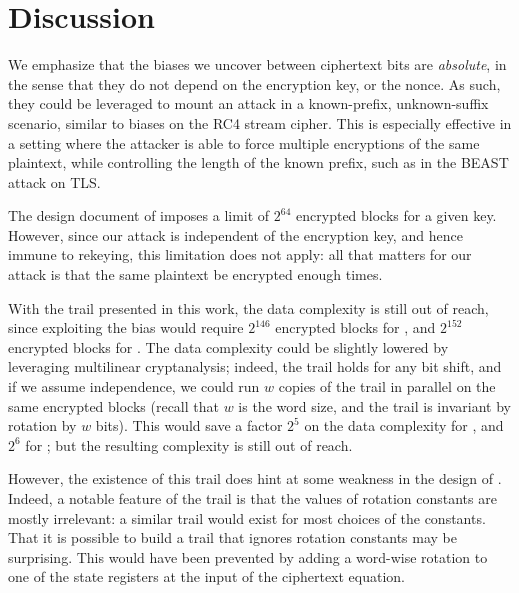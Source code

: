 \section{Discussion}
\label{sec/Discussion}


We emphasize that the biases we uncover between ciphertext bits are \emph{absolute}, in the sense that they do not depend on the encryption key, or the nonce. As such, they could be leveraged to mount an attack in a known-prefix, unknown-suffix scenario, similar to biases on the RC4 stream cipher. This is especially effective in a setting where the attacker is able to force multiple encryptions of the same plaintext, while controlling the length of the known prefix, such as in the BEAST attack on TLS.

The design document of  imposes a limit of $2^{64}$ encrypted blocks for a given key. However, since our attack is independent of the encryption key, and hence immune to rekeying, this limitation does not apply: all that matters for our attack is that the same plaintext be encrypted enough times.

With the trail presented in this work, the data complexity is still out of reach, since exploiting the bias would require $2^{146}$ encrypted blocks for , and $2^{152}$ encrypted blocks for . The data complexity could be slightly lowered by leveraging multilinear cryptanalysis; indeed, the trail holds for any bit shift, and if we assume independence, we could run $w$ copies of the trail in parallel on the same encrypted blocks (recall that $w$ is the word size, and the trail is invariant by rotation by $w$ bits). This would save a factor $2^5$ on the data complexity for , and $2^6$ for ; but the resulting complexity is still out of reach.

However, the existence of this trail does hint at some weakness in the design of . Indeed, a notable feature of the trail is that the values of rotation constants are mostly irrelevant: a similar trail would exist for most choices of the constants. That it is possible to build a trail that ignores rotation constants may be surprising. This would have been prevented by adding a word-wise rotation to one of the state registers at the input of the ciphertext equation.
